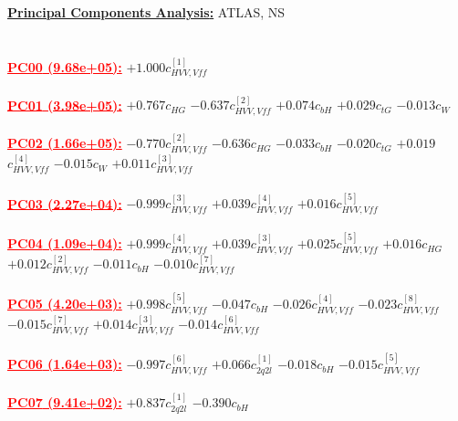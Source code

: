 \documentclass{article}
\begin{document}
\noindent \underline{\bf{Principal Components Analysis}:} ATLAS, NS\\ \\ \\
\noindent \textcolor{red}{\underline{\bf{PC00} (9.68e+05):}}
{$+1.000$}{\rm $c_{HVV,Vff}^{[1]}$} 
 \nonumber \\ \nonumber \\ 
\noindent \textcolor{red}{\underline{\bf{PC01} (3.98e+05):}}
{$+0.767$}{\rm $c_{HG}$} 
{$-0.637$}{\rm $c_{HVV,Vff}^{[2]}$} 
{$+0.074$}{\rm $c_{bH}$} 
{$+0.029$}{\rm $c_{tG}$} 
{$-0.013$}{\rm $c_{W}$} 
 \nonumber \\ \nonumber \\ 
\noindent \textcolor{red}{\underline{\bf{PC02} (1.66e+05):}}
{$-0.770$}{\rm $c_{HVV,Vff}^{[2]}$} 
{$-0.636$}{\rm $c_{HG}$} 
{$-0.033$}{\rm $c_{bH}$} 
{$-0.020$}{\rm $c_{tG}$} 
{$+0.019$}{\rm $c_{HVV,Vff}^{[4]}$} 
{$-0.015$}{\rm $c_{W}$} 
{$+0.011$}{\rm $c_{HVV,Vff}^{[3]}$} 
 \nonumber \\ \nonumber \\ 
\noindent \textcolor{red}{\underline{\bf{PC03} (2.27e+04):}}
{$-0.999$}{\rm $c_{HVV,Vff}^{[3]}$} 
{$+0.039$}{\rm $c_{HVV,Vff}^{[4]}$} 
{$+0.016$}{\rm $c_{HVV,Vff}^{[5]}$} 
 \nonumber \\ \nonumber \\ 
\noindent \textcolor{red}{\underline{\bf{PC04} (1.09e+04):}}
{$+0.999$}{\rm $c_{HVV,Vff}^{[4]}$} 
{$+0.039$}{\rm $c_{HVV,Vff}^{[3]}$} 
{$+0.025$}{\rm $c_{HVV,Vff}^{[5]}$} 
{$+0.016$}{\rm $c_{HG}$} 
{$+0.012$}{\rm $c_{HVV,Vff}^{[2]}$} 
{$-0.011$}{\rm $c_{bH}$} 
{$-0.010$}{\rm $c_{HVV,Vff}^{[7]}$} 
 \nonumber \\ \nonumber \\ 
\noindent \textcolor{red}{\underline{\bf{PC05} (4.20e+03):}}
{$+0.998$}{\rm $c_{HVV,Vff}^{[5]}$} 
{$-0.047$}{\rm $c_{bH}$} 
{$-0.026$}{\rm $c_{HVV,Vff}^{[4]}$} 
{$-0.023$}{\rm $c_{HVV,Vff}^{[8]}$} 
{$-0.015$}{\rm $c_{HVV,Vff}^{[7]}$} 
{$+0.014$}{\rm $c_{HVV,Vff}^{[3]}$} 
{$-0.014$}{\rm $c_{HVV,Vff}^{[6]}$} 
 \nonumber \\ \nonumber \\ 
\noindent \textcolor{red}{\underline{\bf{PC06} (1.64e+03):}}
{$-0.997$}{\rm $c_{HVV,Vff}^{[6]}$} 
{$+0.066$}{\rm $c_{2q2l}^{[1]}$} 
{$-0.018$}{\rm $c_{bH}$} 
{$-0.015$}{\rm $c_{HVV,Vff}^{[5]}$} 
 \nonumber \\ \nonumber \\ 
\noindent \textcolor{red}{\underline{\bf{PC07} (9.41e+02):}}
{$+0.837$}{\rm $c_{2q2l}^{[1]}$} 
{$-0.390$}{\rm $c_{bH}$} 
\end{document}

